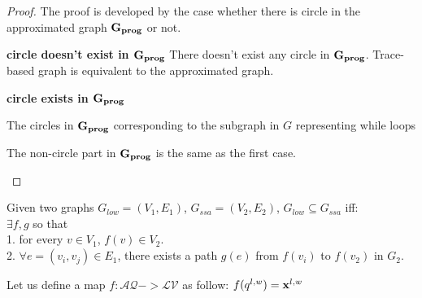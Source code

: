 \documentclass[a4paper,11pt]{article}
\begin{document}
{\begin{proof}
%
The proof is developed by the case whether there is circle in the approximated graph $\bf{G_{prog}}$ or not.
\begin{mainitem}
	\item
	\textbf{circle doesn't exist in $\bf{G_{prog}}$}
	There doesn't exist any circle in $\bf{G_{prog}}$.
	Trace-based graph is equivalent to the approximated graph.
%
	\item
	\textbf{circle exists in $\bf{G_{prog}}$}
	\begin{enumsub}
		\item
		The circles in $\bf{G_{prog}}$ corresponding to the subgraph in $G$ representing while loops 
		\item
		The non-circle part in $\bf{G_{prog}}$ is the same as the first case.
	\end{enumsub}
\end{mainitem}
\end{proof}
}

\begin{defn}
[Subgraph]
Given two graphs $G_{low} = (V_1, E_1)$, $G_{ssa} = (V_2, E_2)$, $G_{low} \subseteq G_{ssa}$ iff:\\
$\exists f, g$ so that \\
1. for every $v \in V_1$, $f(v) \in V_2$. 
\\
2. $\forall e=(v_i, v_j) \in E_1$, there exists a path $g(e)$ from $f(v_i)$ to $f(v_2)$ in $G_2$.
\end{defn}
%
%
\begin{defn}
\label{lem:vertexmap}
Let us define a map $f: \mathcal{AQ} -> \mathcal{LV} $ as follow:
$f(q^{l,w}) = \mathbf{{x}}^{l,w}$ 
\end{defn}
\end{document}
